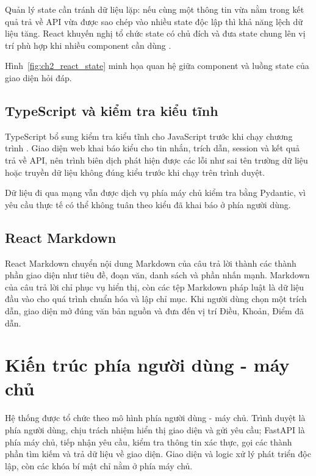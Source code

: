 \documentclass[12pt,a4paper,oneside]{report}
\begin{document}
Quản lý state cần tránh dữ liệu lặp: nếu cùng một thông tin vừa nằm trong kết quả trả về API vừa được sao chép vào nhiều state độc lập thì khả năng lệch dữ liệu tăng. React khuyến nghị tổ chức state có chủ đích và đưa state chung lên vị trí phù hợp khi nhiều component cần dùng \cite{react_state_docs}.

Hình~\ref{fig:ch2_react_state} minh họa quan hệ giữa component và luồng state của giao diện hỏi đáp.

\subsection{TypeScript và kiểm tra kiểu tĩnh}
TypeScript bổ sung kiểm tra kiểu tĩnh cho JavaScript trước khi chạy chương trình \cite{typescript_docs}. Giao diện web khai báo kiểu cho tin nhắn, trích dẫn, session và kết quả trả về API, nên trình biên dịch phát hiện được các lỗi như sai tên trường dữ liệu hoặc truyền dữ liệu không đúng kiểu trước khi chạy trên trình duyệt.

Dữ liệu đi qua mạng vẫn được dịch vụ phía máy chủ kiểm tra bằng Pydantic, vì yêu cầu thực tế có thể không tuân theo kiểu đã khai báo ở phía người dùng.

\subsection{React Markdown}
React Markdown chuyển nội dung Markdown của câu trả lời thành các thành phần giao diện như tiêu đề, đoạn văn, danh sách và phần nhấn mạnh. Markdown của câu trả lời chỉ phục vụ hiển thị, còn các tệp Markdown pháp luật là dữ liệu đầu vào cho quá trình chuẩn hóa và lập chỉ mục.
Khi người dùng chọn một trích dẫn, giao diện mở đúng văn bản nguồn và đưa đến vị trí Điều, Khoản, Điểm đã dẫn.


\section{Kiến trúc phía người dùng - máy chủ}
Hệ thống được tổ chức theo mô hình phía người dùng - máy chủ. Trình duyệt là phía người dùng, chịu trách nhiệm hiển thị giao diện và gửi yêu cầu; FastAPI là phía máy chủ, tiếp nhận yêu cầu, kiểm tra thông tin xác thực, gọi các thành phần tìm kiếm và trả dữ liệu về giao diện. Giao diện và logic xử lý phát triển độc lập, còn các khóa bí mật chỉ nằm ở phía máy chủ.
\end{document}
